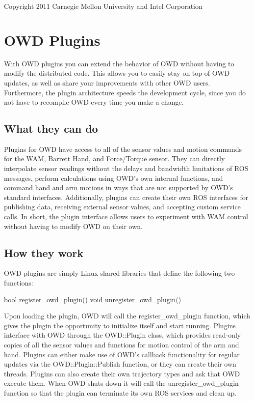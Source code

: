 \begin{DoxyVerb}Copyright 2011 Carnegie Mellon University and Intel Corporation
\end{DoxyVerb}
 \hypertarget{plugins}{}\section{O\-W\-D Plugins}\label{plugins}
With O\-W\-D plugins you can extend the behavior of O\-W\-D without having to modify the distributed code. This allows you to easily stay on top of O\-W\-D updates, as well as share your improvements with other O\-W\-D users. Furthermore, the plugin architecture speeds the development cycle, since you do not have to recompile O\-W\-D every time you make a change.\hypertarget{plugins_plugin_what}{}\subsection{What they can do}\label{plugins_plugin_what}
Plugins for O\-W\-D have access to all of the sensor values and motion commands for the W\-A\-M, Barrett Hand, and Force/\-Torque sensor. They can directly interpolate sensor readings without the delays and bandwidth limitations of R\-O\-S messages, perform calculations using O\-W\-D's own internal functions, and command hand and arm motions in ways that are not supported by O\-W\-D's standard interfaces. Additionally, plugins can create their own R\-O\-S interfaces for publishing data, receiving external sensor values, and accepting custom service calls. In short, the plugin interface allows users to experiment with W\-A\-M control without having to modify O\-W\-D on their own.\hypertarget{plugins_plugin_how}{}\subsection{How they work}\label{plugins_plugin_how}
O\-W\-D plugins are simply Linux shared libraries that define the following two functions\-:

\begin{DoxyVerb}bool register_owd_plugin()
void unregister_owd_plugin()
\end{DoxyVerb}


Upon loading the plugin, O\-W\-D will call the register\-\_\-owd\-\_\-plugin function, which gives the plugin the opportunity to initialize itself and start running. Plugins interface with O\-W\-D through the O\-W\-D\-::\-Plugin class, which provides read-\/only copies of all the sensor values and functions for motion control of the arm and hand. Plugins can either make use of O\-W\-D's callback functionality for regular updates via the O\-W\-D\-::\-Plugin\-::\-Publish function, or they can create their own threads. Plugins can also create their own trajectory types and ask that O\-W\-D execute them. When O\-W\-D shuts down it will call the unregister\-\_\-owd\-\_\-plugin function so that the plugin can terminate its own R\-O\-S services and clean up.

